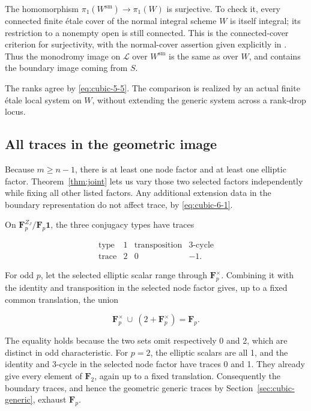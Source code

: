 \documentclass[11pt]{article}
\begin{document}
The homomorphism \(\pi_1(W^{\mathrm{sm}})\to\pi_1(W)\) is surjective. To check it, every connected finite étale cover of the normal integral scheme \(W\) is itself integral; its restriction to a nonempty open is still connected. This is the connected-cover criterion for surjectivity, with the normal-cover assertion given explicitly in \citet[Lemma~58.11.2, Tag~0BQL]{StacksNormal}. Thus the monodromy image on \(\mathcal L\) over \(W^{\mathrm{sm}}\) is the same as over \(W\), and contains the boundary image coming from \(S\).

The ranks agree by \eqref{eq:cubic-5-5}. The comparison is realized by an actual finite étale local system on \(W\), without extending the generic system across a rank-drop locus.

\subsection{All traces in the geometric image}\label{sec:cubic-traces}

Because \(m\ge n-1\), there is at least one node factor and at least one elliptic factor. Theorem~\ref{thm:joint} lets us vary those two selected factors independently while fixing all other listed factors. Any additional extension data in the boundary representation do not affect trace, by \eqref{eq:cubic-6-1}.

On \(\mathbf F_p^{Z_J}/\mathbf F_p\mathbf1\), the three conjugacy types have traces

\begin{equation}
\begin{array}{c|ccc}
\text{type}&1&\text{transposition}&\text{3-cycle}\\\hline
\text{trace}&2&0&-1.
\end{array}
\label{eq:cubic-8-1}
\end{equation}

For odd \(p\), let the selected elliptic scalar range through \(\mathbf F_p^\times\). Combining it with the identity and transposition in the selected node factor gives, up to a fixed common translation, the union

\[
\mathbf F_p^\times\ \cup\ (2+\mathbf F_p^\times)
=\mathbf F_p.
\]

The equality holds because the two sets omit respectively 0 and 2, which are distinct in odd characteristic. For \(p=2\), the elliptic scalars are all 1, and the identity and 3-cycle in the selected node factor have traces 0 and 1. They already give every element of \(\mathbf F_2\), again up to a fixed translation. Consequently the boundary traces, and hence the geometric generic traces by Section~\ref{sec:cubic-generic}, exhaust \(\mathbf F_p\).
\end{document}
